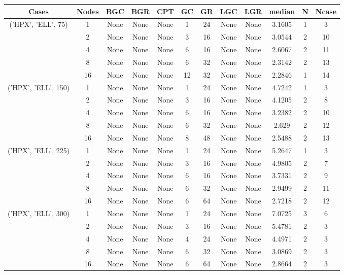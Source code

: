 \begin{tabular}{cccccccccccc}
\hline
Cases & Nodes& BGC& BGR& CPT& GC& GR& LGC& LGR& median & N & Ncase \\
\hline
\multirow{5}{*}{('HPX', 'ELL', 75)}& 1& None& None& None& 1& 24& None& None& 3.1605& 1& 3\\
& 2& None& None& None& 3& 16& None& None& 3.0544& 2& 10\\
& 4& None& None& None& 6& 16& None& None& 2.6067& 2& 11\\
& 8& None& None& None& 6& 32& None& None& 2.3142& 2& 13\\
& 16& None& None& None& 12& 32& None& None& 2.2846& 1& 14\\
\hline
\multirow{5}{*}{('HPX', 'ELL', 150)}& 1& None& None& None& 1& 24& None& None& 4.7242& 1& 3\\
& 2& None& None& None& 3& 16& None& None& 4.1205& 2& 8\\
& 4& None& None& None& 6& 16& None& None& 3.2382& 2& 10\\
& 8& None& None& None& 6& 32& None& None& 2.629& 2& 12\\
& 16& None& None& None& 8& 48& None& None& 2.5488& 2& 13\\
\hline
\multirow{5}{*}{('HPX', 'ELL', 225)}& 1& None& None& None& 1& 24& None& None& 5.2647& 1& 3\\
& 2& None& None& None& 3& 16& None& None& 4.9805& 2& 7\\
& 4& None& None& None& 6& 16& None& None& 3.7331& 2& 9\\
& 8& None& None& None& 6& 32& None& None& 2.9499& 2& 11\\
& 16& None& None& None& 6& 64& None& None& 2.7218& 2& 12\\
\hline
\multirow{5}{*}{('HPX', 'ELL', 300)}& 1& None& None& None& 1& 24& None& None& 7.0725& 3& 6\\
& 2& None& None& None& 3& 16& None& None& 5.4781& 2& 3\\
& 4& None& None& None& 4& 24& None& None& 4.4971& 2& 3\\
& 8& None& None& None& 6& 32& None& None& 3.0869& 2& 3\\
& 16& None& None& None& 6& 64& None& None& 2.8664& 2& 3\\
\hline
\end{tabular}



